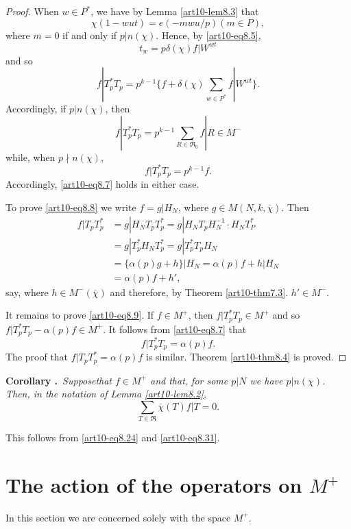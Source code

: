 \begin{proof}
When $w\in P^{*}$, we have by Lemma \ref{art10-lem8.3} that
$$
\chi(1-wut)=e(-mwu/p)(m\in P),
$$
where $m=0$ if and only if $p|n(\chi)$. Hence, by \eqref{art10-eq8.5},
$$
t_{w}=p\delta(\chi)f|W^{wt}
$$
and so
\begin{equation}
f|T^{*}_{p}T_{p}=p^{k-1}\{f+\delta(\chi)\sum\limits_{w\in P^{*}}f|W^{wt}\}.\label{art10-eq8.30}
\end{equation}
Accordingly, if $p|n(\chi)$, then
\begin{equation}
f|T^{*}_{p}T_{p}=p^{k-1}\sum\limits_{R\in \mathfrak{R}_{0}}f|R\in M^{-}\label{art10-eq8.31}
\end{equation}
while, when $p\nmid n(\chi)$,
\begin{equation}
f|T^{*}_{p}T_{p}=p^{k-1}f.\label{art10-eq8.32}
\end{equation}
Accordingly, \eqref{art10-eq8.7} holds in either case.

To prove \eqref{art10-eq8.8} we write $f=g|H_{N}$, where $g\in M(N,k,\overline{\chi})$. Then
\begin{align*}
f|T_{p}T^{*}_{p} &= g|H_{N}T_{p}T^{*}_{p}=g|H_{N}T_{p}H^{-1}_{N}\cdot H_{N}T^{*}_{P}\\
&= g|T^{*}_{p}H_{N}T^{*}_{p}=g|T^{*}_{p}T_{p}H_{N}\\
&= \{\alpha(p)g+h\}|H_{N}=\alpha(p)f+h|H_{N}\\
&= \alpha(p)f+h',
\end{align*}
say, where $h\in M^{-}(\overline{\chi})$ and therefore, by Theorem \ref{art10-thm7.3}. $h'\in M^{-}$.

It remains to prove \eqref{art10-eq8.9}. If $f\in M^{+}$, then $f|T^{*}_{p}T_{p}\in M^{+}$ and so $f|T^{*}_{p}T_{p}-\alpha(p)f\in M^{+}$. It follows from \eqref{art10-eq8.7} that
$$
f|T^{*}_{p}T_{p}=\alpha(p)f.
$$
The proof that $f|T_{p}T^{*}_{p}=\alpha(p)f$ is similar. Theorem \ref{art10-thm8.4} is proved.
\end{proof}

\medskip
\noindent
{\bf Corollary .\label{art10-coro8.5}}~{\em Suppose\pageoriginale that $f\in M^{+}$ and that, for some $p|N$ we have $p|n(\chi)$. Then, in the notation of Lemma \ref{art10-lem8.2},}
$$
\sum\limits_{T\in \mathfrak{R}}\overline{\chi}(T)f|T=0.
$$

This follows from \eqref{art10-eq8.24} and \eqref{art10-eq8.31}.

\section{The action of the operators on $M^{+}$}\label{art10-sec9}
In this section we are concerned solely with the space $M^{+}$.


